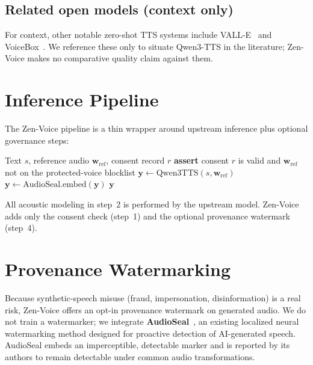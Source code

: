 \documentclass[11pt,a4paper]{article}
\begin{document}
\subsection{Related open models (context only)}

For context, other notable zero-shot TTS systems include VALL-E~\citep{wang2023neural}
and VoiceBox~\citep{le2024voicebox}. We reference these only to situate Qwen3-TTS in the
literature; Zen-Voice makes no comparative quality claim against them.

\section{Inference Pipeline}
\label{sec:architecture}

The Zen-Voice pipeline is a thin wrapper around upstream inference plus optional
governance steps:

\begin{algorithm}[t]
\caption{Zen-Voice inference (wrapper over upstream Qwen3-TTS)}
\label{alg:inference}
\begin{algorithmic}[1]
\Require Text $s$, reference audio $\bm{w}_{\text{ref}}$, consent record $r$
\State \textbf{assert} consent $r$ is valid and $\bm{w}_{\text{ref}}$ not on the protected-voice blocklist
\State $\bm{y} \leftarrow \text{Qwen3TTS}(s, \bm{w}_{\text{ref}})$ 
    \State $\bm{y} \leftarrow \text{AudioSeal.embed}(\bm{y})$ 
\EndIf
\State \Return $\bm{y}$
\end{algorithmic}
\end{algorithm}

All acoustic modeling in step~2 is performed by the upstream model. Zen-Voice adds only
the consent check (step~1) and the optional provenance watermark (step~4).

\section{Provenance Watermarking}
\label{sec:watermark}

Because synthetic-speech misuse (fraud, impersonation, disinformation) is a real risk,
Zen-Voice offers an opt-in provenance watermark on generated audio. We do not train a
watermarker; we integrate \textbf{AudioSeal}~\citep{san2024proactive}, an existing
localized neural watermarking method designed for proactive detection of AI-generated
speech. AudioSeal embeds an imperceptible, detectable marker and is reported by its
authors to remain detectable under common audio transformations.
\end{document}
